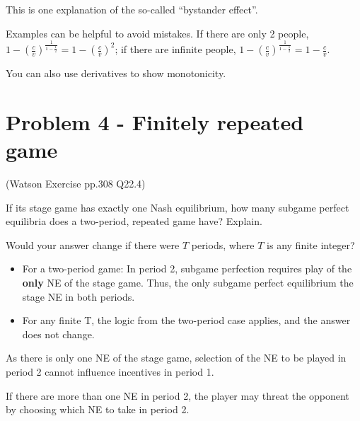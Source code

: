 \documentclass{article}
\begin{document}
\begin{mdframed}[backgroundcolor=blue!20,linecolor=white]
This is one explanation of the so-called ``bystander effect''.
\end{mdframed}

\begin{mdframed}[backgroundcolor=yellow!20,linecolor=white]

Examples can be helpful to avoid mistakes. If there are only 2 people, $1-\left( \tfrac{c}{v} \right)^\frac 1{1-\tfrac 1 2} =1- \left( \tfrac{c}{v} \right)^2$; if there are infinite people,  $1- \left( \tfrac{c}{v} \right)^\frac 1{1-\tfrac 1 2} =1- \tfrac{c}{v}$.

\smallskip
You can also use derivatives to show monotonicity.
\end{mdframed}




\section{Problem 4 - Finitely repeated game}

(Watson Exercise pp.308 Q22.4)

If its stage game has exactly one Nash equilibrium, how many subgame
perfect equilibria does a two-period, repeated game have? Explain. 

\smallskip

Would your answer change if there were $T$ periods, where $T$ is any finite integer?

\bigskip


\begin{itemize}
\item For a two-period game: In period 2, subgame perfection requires play of the \textbf{only} NE
of the stage game. Thus, the only subgame perfect equilibrium the stage NE in both periods. 

\item For any finite T, the logic from the two-period case applies, and the answer does not
change.

\end{itemize}

\begin{mdframed}[backgroundcolor=blue!20,linecolor=white]
As there is only one NE of the stage game,
selection of the NE to be played in period 2 cannot influence
incentives in period 1.

\medskip 

If there are more than one NE in period 2, 
the player may threat the opponent by choosing which NE to take in period 2.

\end{mdframed}
\end{document}
